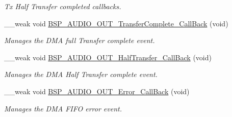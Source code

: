 \begin{DoxyCompactItemize}
\begin{DoxyCompactList}\small\item\em Tx Half Transfer completed callbacks. \end{DoxyCompactList}\item 
\mbox{\label{group___s_t_m32_f4___d_i_s_c_o_v_e_r_y___a_u_d_i_o___o_u_t___private___functions_gaf7ceb1ce884743eca48891ae255db74b}} 
\+\_\+\+\_\+weak void \mbox{\hyperlink{group___s_t_m32_f4___d_i_s_c_o_v_e_r_y___a_u_d_i_o___o_u_t___private___functions_gaf7ceb1ce884743eca48891ae255db74b}{B\+S\+P\+\_\+\+A\+U\+D\+I\+O\+\_\+\+O\+U\+T\+\_\+\+Transfer\+Complete\+\_\+\+Call\+Back}} (void)
\begin{DoxyCompactList}\small\item\em Manages the D\+MA full Transfer complete event. \end{DoxyCompactList}\item 
\mbox{\label{group___s_t_m32_f4___d_i_s_c_o_v_e_r_y___a_u_d_i_o___o_u_t___private___functions_ga7c6ef28402c2ebe4ab512e4e5147b559}} 
\+\_\+\+\_\+weak void \mbox{\hyperlink{group___s_t_m32_f4___d_i_s_c_o_v_e_r_y___a_u_d_i_o___o_u_t___private___functions_ga7c6ef28402c2ebe4ab512e4e5147b559}{B\+S\+P\+\_\+\+A\+U\+D\+I\+O\+\_\+\+O\+U\+T\+\_\+\+Half\+Transfer\+\_\+\+Call\+Back}} (void)
\begin{DoxyCompactList}\small\item\em Manages the D\+MA Half Transfer complete event. \end{DoxyCompactList}\item 
\mbox{\label{group___s_t_m32_f4___d_i_s_c_o_v_e_r_y___a_u_d_i_o___o_u_t___private___functions_gaefcdc4b08ef3624bde86a2ce034201bb}} 
\+\_\+\+\_\+weak void \mbox{\hyperlink{group___s_t_m32_f4___d_i_s_c_o_v_e_r_y___a_u_d_i_o___o_u_t___private___functions_gaefcdc4b08ef3624bde86a2ce034201bb}{B\+S\+P\+\_\+\+A\+U\+D\+I\+O\+\_\+\+O\+U\+T\+\_\+\+Error\+\_\+\+Call\+Back}} (void)
\begin{DoxyCompactList}\small\item\em Manages the D\+MA F\+I\+FO error event. \end{DoxyCompactList}\end{DoxyCompactItemize}


